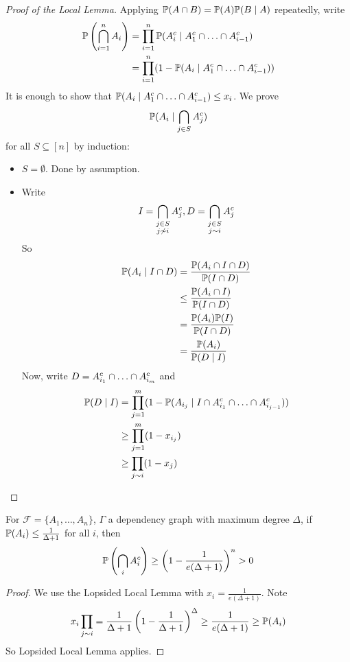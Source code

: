 \documentclass{article}
\begin{document}
\begin{proof}[Proof of the Local Lemma]
  Applying $\P(A \inter B) = \P(A) \P(B \mid A)$ repeatedly, write
  \begin{align*}
    \P\left(\Inter_{i = 1}^n A_i\right)
    & = \prod_{i = 1}^n \P(A_i^c \mid A_1^c \inter \dots \inter A_{i - 1}^c) \\
    & = \prod_{i = 1}^n (1 - \P(A_i \mid A_1^c \inter \dots \inter A_{i - 1}^c))
  \end{align*}
  It is enough to show that $\P(A_i \mid A_1^c \inter \dots \inter A_{i - 1}^c) \le x_i$. We prove
  $$\P(A_i \mid \Inter_{j \in S} A_j^c)$$
  for all $S \subseteq [n]$ by induction:
  \begin{itemize}
    \item $S = \emptyset$. Done by assumption.
    \item Write
    $$I = \Inter_{\substack{j \in S \\ j \not\sim i}} A_j^c, D = \Inter_{\substack{j \in S \\ j \sim i}} A_j^c$$
    So
    \begin{align*}
      \P(A_i \mid I \inter D)
      & = \frac{\P(A_i \inter I \inter D)}{\P(I \inter D)} \\
      & \le \frac{\P(A_i \inter I)}{\P(I \inter D)} \\
      & = \frac{\P(A_i)\P(I)}{\P(I \inter D)} \\
      & = \frac{\P(A_i)}{\P(D \mid I)}
    \end{align*}
    Now, write $D = A_{i_1}^c \inter \dots \inter A_{i_m}^c$ and
    \begin{align*}
    \P(D \mid I)
    & = \prod_{j = 1}^m (1 - \P(A_{i_j} \mid I \inter A_{i_1}^c \inter \dots \inter A_{i_{j - 1}}^c)) \\
    & \ge \prod_{j = 1}^m (1 - x_{i_j}) \\
    & \ge \prod_{j \sim i} (1 - x_j)
    \end{align*}
  \end{itemize}
\end{proof}

\begin{thm}
  For $\mathcal F = \{A_1, \dots, A_n\}$, $\Gamma$ a dependency graph with maximum degree $\Delta$, if $\P(A_i) \le \frac 1{\Delta + 1}$ for all $i$, then
  $$\P\left(\Inter_i A_i^c\right) \ge \left(1 - \frac 1{e(\Delta + 1)}\right)^n > 0$$
\end{thm}
\begin{proof}
  We use the Lopsided Local Lemma with $x_i = \frac 1{e(\Delta + 1)}$. Note
  $$x_i \prod_{j \sim i} = \frac 1{\Delta + 1}\left(1 - \frac 1{\Delta + 1}\right)^\Delta \ge \frac 1{e(\Delta + 1)} \ge \P(A_i)$$
  So Lopsided Local Lemma applies.
\end{proof}
\end{document}
